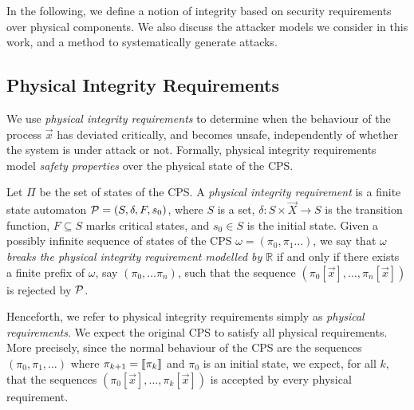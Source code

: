 In the following, we define a notion of integrity based on security requirements over physical components. We also discuss the attacker models we consider in this work, and a method to systematically generate attacks.

\subsection{Physical Integrity Requirements}{
We use \emph{physical integrity requirements} to determine when the behaviour of the process $\vec{x}$ has deviated critically, and becomes unsafe, independently of whether the system is under attack or not. Formally, physical integrity requirements model \emph{safety properties} over the physical state of the CPS.
\begin{definition}
  Let $\Pi$ be the set of states of the CPS. A \emph{physical integrity requirement} is a finite state automaton $\mathcal{P}=(S,\delta,F,s_0)$, where $S$ is a set, $\delta\colon S\times \vec{X}\rightarrow S$ is the transition function, $F\subseteq S$ marks critical states, and $s_0\in S$ is the initial state. Given a possibly infinite sequence of states of the CPS $\omega=(\pi_0,\pi_1 \ldots)$, we say that \emph{$\omega$ breaks the physical integrity requirement modelled by $\mathbb{R}$} if and only if there exists a finite prefix of $\omega$, say $(\pi_0,\ldots\pi_n)$, such that the sequence $(\pi_0[\vec{x}],\ldots, \pi_n[\vec{x}])$ is rejected by $\mathcal{P}$. %
\end{definition}
  Henceforth, we refer to physical integrity requirements simply as \emph{physical requirements}. We expect the original CPS to satisfy all physical requirements. More precisely, since the normal behaviour of the CPS are the sequences $(\pi_0, \pi_1, \ldots)$ where $\pi_{k+1}={{\llbracket\pi_k\rrbracket}}$ and $\pi_0$ is an initial state, we expect, for all $k$, that the sequences $(\pi_0[\vec{x}],\ldots,\pi_k[\vec{x}])$ is accepted by every physical requirement.

}
